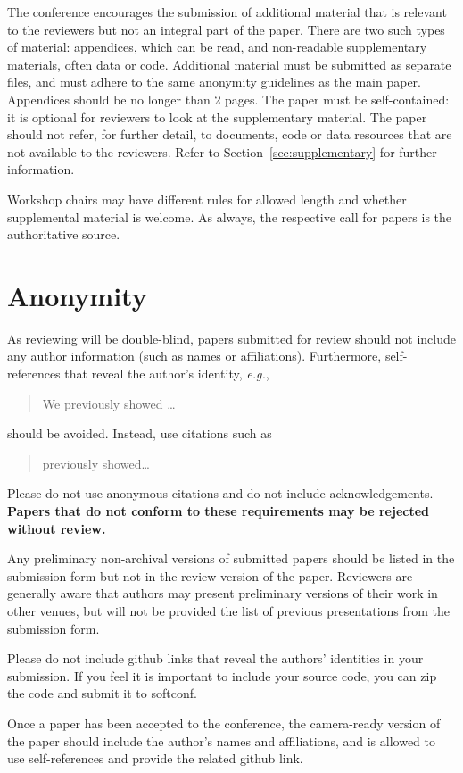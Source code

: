 \documentclass[11pt,a4paper]{article}
\begin{document}
The conference encourages the submission of additional material that is relevant to the reviewers but not an integral part of the paper.
There are two such types of material: appendices, which can be read, and non-readable supplementary materials, often data or code. 
Additional material must be submitted as separate files, and must adhere to the same anonymity guidelines as the main paper. Appendices should be no longer than 2 pages.
The paper must be self-contained: it is optional for reviewers to look at the supplementary material.
The paper should not refer, for further detail, to documents, code or data resources that are not available to the reviewers.
Refer to Section~\ref{sec:supplementary} for further information. 

Workshop chairs may have different rules for allowed length and whether supplemental material is welcome.
As always, the respective call for papers is the authoritative source.


\section{Anonymity}
As reviewing will be double-blind, papers submitted for review should not include any author information (such as names or affiliations). Furthermore, self-references that reveal the author's identity, \emph{e.g.},
\begin{quote}
We previously showed \citep{Gusfield:97} \ldots
\end{quote}
should be avoided. Instead, use citations such as 
\begin{quote}
\citet{Gusfield:97} previously showed\ldots
\end{quote}
Please do not use anonymous citations and do not include acknowledgements.
\textbf{Papers that do not conform to these requirements may be rejected without review.}

Any preliminary non-archival versions of submitted papers should be listed in the submission form but not in the review version of the paper.
Reviewers are generally aware that authors may present preliminary versions of their work in other venues, but will not be provided the list of previous presentations from the submission form. 

Please do not include github links that reveal the authors' identities in your submission. If you feel it is important to include your source code, you can zip the code and submit it to softconf. 

Once a paper has been accepted to the conference, the camera-ready version of the paper should include the author's names and affiliations, and is allowed to use self-references and provide the related github link.
\end{document}
